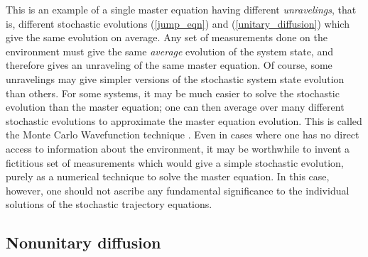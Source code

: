 \documentclass[12pt]{article}
\begin{document}
This is an example of a single master equation having different
{\it unravelings}, that is, different stochastic evolutions
(\ref{jump_eqn}) and (\ref{unitary_diffusion}) which give
the same evolution on average.  Any set of measurements done on the
environment must give the same {\it average} evolution of the system state,
and therefore gives an unraveling of the same master equation.  Of
course, some unravelings may give simpler versions of the stochastic
system state evolution than others.  For some systems, it may be much
easier to solve the stochastic evolution than the master equation; one
can then average over many different stochastic evolutions to approximate
the master equation evolution.  This is called the Monte Carlo Wavefunction
technique \cite{Dalibard}.  Even in cases where one has no direct
access to information about the environment,
it may be worthwhile to invent a fictitious set
of measurements which would give a simple stochastic evolution, purely
as a numerical technique to solve the master equation.  In this case,
however, one should not ascribe any fundamental significance to the
individual solutions of the stochastic trajectory equations.

\subsection{Nonunitary diffusion}
\end{document}
